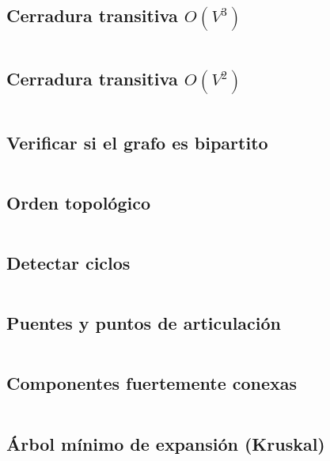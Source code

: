 \documentclass[11pt]{article}
\begin{document}
		\subsection{Cerradura transitiva $O(V^3)$}
		\inputminted[tabsize=2,breaklines,firstline=177,lastline=184,fontsize=\small]{c++}{graph.cpp}
		
		\subsection{Cerradura transitiva $O(V^2)$}
		\inputminted[tabsize=2,breaklines,firstline=186,lastline=200,fontsize=\small]{c++}{graph.cpp}
		
		\subsection{Verificar si el grafo es bipartito}
		\inputminted[tabsize=2,breaklines,firstline=202,lastline=224,fontsize=\small]{c++}{graph.cpp}
		
		\subsection{Orden topológico}
		\inputminted[tabsize=2,breaklines,firstline=226,lastline=252,fontsize=\small]{c++}{graph.cpp}

		\subsection{Detectar ciclos}
		\inputminted[tabsize=2,breaklines,firstline=254,lastline=274,fontsize=\small]{c++}{graph.cpp}
		
		\subsection{Puentes y puntos de articulación}
		\inputminted[tabsize=2,breaklines,firstline=276,lastline=304,fontsize=\small]{c++}{graph.cpp}
		
		\subsection{Componentes fuertemente conexas}
		\inputminted[tabsize=2,breaklines,firstline=306,lastline=335,fontsize=\small]{c++}{graph.cpp}
		
		\subsection{Árbol mínimo de expansión (Kruskal)}
		\inputminted[tabsize=2,breaklines,firstline=337,lastline=353,fontsize=\small]{c++}{graph.cpp}
		
\end{document}
